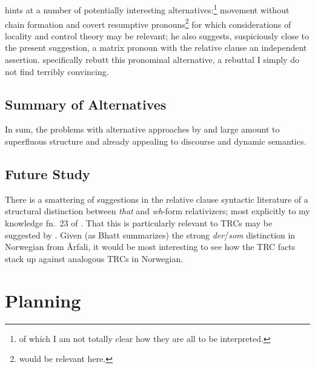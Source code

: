 \documentclass[11pt]{article}
\begin{document}
\subsection{\citet{vonfintelAmountRelativesMeaning1999}}
\citet{vonfintelAmountRelativesMeaning1999} hints at a number of potentially interesting alternatives:\footnote{of which I am not totally clear how they are all to be interpreted.} movement without chain formation and covert resumptive pronouns\footnote{\citet{postalContrastingExtractionTypes1994} would be relevant here.} for which considerations of locality and control theory may be relevant; he also suggests, suspiciously close to the present suggestion, a matrix pronoun with the relative clause an independent assertion. \citet{grosuAmountRelatives2017} specifically rebutt this pronominal alternative, a rebuttal I simply do not find terribly convincing.

\subsection{Summary of Alternatives}

In sum, the problems with alternative approaches by and large amount to superfluous structure and already appealing to discourse and dynamic semantics.

\subsection{Future Study}

There is a smattering of suggestions in the relative clause syntactic literature of a structural distinction between \textit{that} and \textit{wh}-form relativizers; most explicitly to my knowledge fn.~23 of \citet{bhattRaisingAnalysisRelative2002}. That this is particularly relevant to TRCs may be suggested by \citet{kayThatVsWhich}. Given (as Bhatt summarizes) the strong \textit{der}/\textit{som} distinction in Norwegian from \AA{}rfali, it would be most interesting to see how the TRC facts stack up against analogous TRCs in Norwegian.

\section{Planning}
\end{document}
